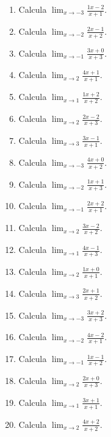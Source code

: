 \documentclass[11pt,a4paper]{article}
\begin{document}
\begin{enumerate}[label=\textbf{E\arabic*.},start=201]

\item Calcula $\displaystyle\lim_{x\to -3}\frac{1x-2}{x+1}$. 

\item Calcula $\displaystyle\lim_{x\to -2}\frac{2x-1}{x+2}$. 

\item Calcula $\displaystyle\lim_{x\to -1}\frac{3x+0}{x+3}$. 

\item Calcula $\displaystyle\lim_{x\to 2}\frac{4x+1}{x+1}$. 

\item Calcula $\displaystyle\lim_{x\to 1}\frac{1x+2}{x+2}$. 

\item Calcula $\displaystyle\lim_{x\to 2}\frac{2x-2}{x+3}$. 

\item Calcula $\displaystyle\lim_{x\to 3}\frac{3x-1}{x+1}$. 

\item Calcula $\displaystyle\lim_{x\to -3}\frac{4x+0}{x+2}$. 

\item Calcula $\displaystyle\lim_{x\to -2}\frac{1x+1}{x+3}$. 

\item Calcula $\displaystyle\lim_{x\to -1}\frac{2x+2}{x+1}$. 

\item Calcula $\displaystyle\lim_{x\to 2}\frac{3x-2}{x+2}$. 

\item Calcula $\displaystyle\lim_{x\to 1}\frac{4x-1}{x+3}$. 

\item Calcula $\displaystyle\lim_{x\to 2}\frac{1x+0}{x+1}$. 

\item Calcula $\displaystyle\lim_{x\to 3}\frac{2x+1}{x+2}$. 

\item Calcula $\displaystyle\lim_{x\to -3}\frac{3x+2}{x+3}$. 

\item Calcula $\displaystyle\lim_{x\to -2}\frac{4x-2}{x+1}$. 

\item Calcula $\displaystyle\lim_{x\to -1}\frac{1x-1}{x+2}$. 

\item Calcula $\displaystyle\lim_{x\to 2}\frac{2x+0}{x+3}$. 

\item Calcula $\displaystyle\lim_{x\to 1}\frac{3x+1}{x+1}$. 

\item Calcula $\displaystyle\lim_{x\to 2}\frac{4x+2}{x+2}$. 

\end{enumerate}
\end{document}

